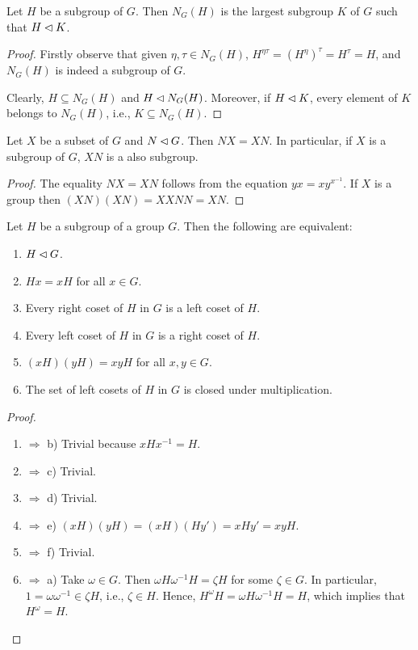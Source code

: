 \begin{lem}
    Let $H$ be a subgroup of\/ $G$. Then $N_G(H)$ is the largest subgroup $K$ of\/ $G$ such that $H\lhd K$.
\end{lem}

\begin{proof} Firstly observe that given $\eta,\tau\in N_G(H)$, $H^{\eta\tau}=(H^\eta)^\tau=H^\tau=H$, and $N_G(H)$ is indeed a subgroup of $G$.

Clearly, $H\subseteq N_G(H)$ and $H\lhd N_G(H)$. Moreover, if $H\lhd K$, every element of $K$ belongs to $N_G(H)$, i.e., $K\subseteq N_G(H)$.
\end{proof}


\begin{cor}\label{product-by-normal}
    Let $X$ be a subset of\/ $G$ and\/ $N\lhd G$. Then $NX=XN
    $. In particular, if $X$ is a subgroup of\/ $G$, $XN$ is a also subgroup.
\end{cor}

\begin{proof} The equality $NX=XN$ follows from the equation $yx=xy^{x^{-1}}$. If $X$ is a group then $(XN)(XN)=XXNN=XN$.
 \end{proof}

\begin{prop} Let\/ $H$ be a subgroup of a group\/ $G$. Then the following are equivalent:
    \begin{enumerate}[\rm a)]
    \item $H \lhd G$.
    \item $Hx = xH$ for all $x \in G$.
    \item Every right coset of\/ $H$ in $G$ is a left coset of $H$.
    \item Every left coset of\/ $H$ in $G$ is a right coset of $H$.
    \item $(xH)(yH) = xyH$ for all $x,y \in G$.
    \item The set of left cosets of\/ $H$ in\/ $G$ is closed under multiplication.
    \end{enumerate}
\end{prop}

\begin{proof}${}$

\begin{enumerate}[\rm a)]
    \item $\Rightarrow$ b) Trivial because $xHx^{-1}=H$.
    \item $\Rightarrow$ c) Trivial.
    \item $\Rightarrow$ d) Trivial.
    \item $\Rightarrow$ e) $(xH)(yH)=(xH)(Hy') = xHy' = xyH$.
    \item $\Rightarrow$ f) Trivial.
    \item $\Rightarrow$ a) Take $\omega\in G$. Then $\omega H\omega^{-1}H=\zeta H$ for some $\zeta\in G$. In particular, $1=\omega\omega^{-1}\in\zeta H$, i.e., $\zeta\in H$. Hence, $H^\omega H=\omega H\omega^{-1}H=H$, which implies that $H^\omega=H$.
\end{enumerate}
 \end{proof}

